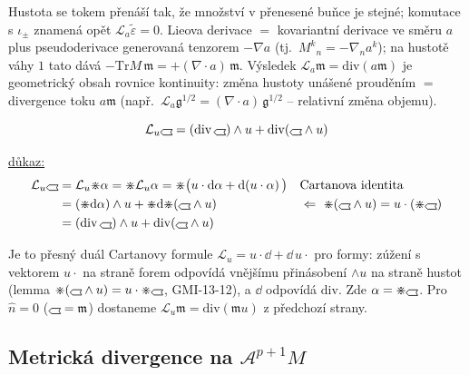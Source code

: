 \begin{vysvetleni}
Hustota se tokem přenáší tak, že množství v přenesené buňce je stejné; komutace s $\iota_\pm$ znamená opět $\mathcal L_a\tilde\varepsilon=0$.
Lieova derivace $=$ kovariantní derivace ve směru $a$ plus pseudoderivace generovaná tenzorem $-\nabla a$ (tj.\ $M^k{}_n = -\nabla_n a^k$);
na hustotě váhy $1$ tato dává $-\mathrm{Tr}M\,\mathfrak m = +(\nabla\cdot a)\,\mathfrak m$. Výsledek $\mathcal L_a\mathfrak m = \mathrm{div}(a\mathfrak m)$
je geometrický obsah rovnice kontinuity: změna hustoty unášené prouděním $=$ divergence toku $a\mathfrak m$
(např.\ $\mathcal L_a\mathfrak g^{1/2} = (\nabla\cdot a)\,\mathfrak g^{1/2}$ -- relativní změna objemu).
\end{vysvetleni}

\begin{veta}
\[
  \mathcal{L}_u\gmIhustsym = (\mathrm{div}\,\gmIhustsym)\wedge u + \mathrm{div}(\gmIhustsym\wedge u)
\]
\end{veta}
\underline{důkaz:}
\begin{align*}
  \mathcal{L}_u\gmIhustsym &= \mathcal{L}_u\gmIhdual\alpha = \gmIhdual\mathcal{L}_u\alpha = \gmIhdual\big(u\cdot\dd\alpha + \dd(u\cdot\alpha)\big)
  && \text{Cartanova identita} \\
  &= (\gmIhdual\dd\alpha)\wedge u + \gmIhdual\dd\gmIhdual(\gmIhustsym\wedge u)
  && \Leftarrow\ \gmIhdual(\gmIhustsym\wedge u) = u\cdot(\gmIhdual\gmIhustsym) \\
  &= (\mathrm{div}\,\gmIhustsym)\wedge u + \mathrm{div}(\gmIhustsym\wedge u)
\end{align*}

\begin{vysvetleni}
Je to přesný duál Cartanovy formule $\mathcal L_u = u\cdot\dd + \dd\,u\cdot$ pro formy: zúžení s vektorem $u\cdot$ na straně forem odpovídá
vnějšímu přinásobení $\wedge u$ na straně hustot (lemma $\gmIhdual(\gmIhustsym\wedge u) = u\cdot\gmIhdual\gmIhustsym$, GMI-13-12),
a $\dd$ odpovídá $\mathrm{div}$. Zde $\alpha = \gmIhdual\gmIhustsym$. Pro $\hat n=0$ ($\gmIhustsym = \mathfrak m$) dostaneme $\mathcal L_u\mathfrak m = \mathrm{div}(\mathfrak m u)$ z předchozí strany.
\end{vysvetleni}

\subsection{Metrická divergence na $\mathcal{A}^{p+1}M$}


